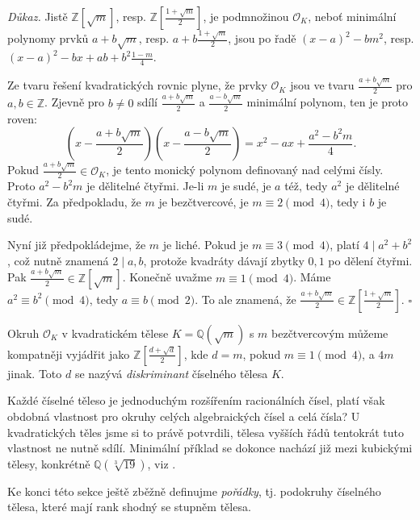 \documentclass[12pt]{report}
\begin{document}
\noindent \textit{Důkaz.} Jistě $\mathbb{Z}[\sqrt{m}]$, resp. $\mathbb{Z}\left[\frac{1+\sqrt{m}}{2}\right]$, je podmnožinou $\mathcal{O}_K$, neboť minimální polynomy prvků $a+b\sqrt{m}$, resp. $a+b\frac{1+\sqrt{m}}{2}$, jsou po řadě $(x-a)^2 - b m^2$, resp. $(x-a)^2 - bx + ab + b^2 \frac{1-m}{4}$.

Ze tvaru řešení kvadratických rovnic plyne, že prvky $\mathcal{O}_K$ jsou ve tvaru $\frac{a+b\sqrt{m}}{2}$ pro $a,b \in \mathbb{Z}$. Zjevně pro $b \neq 0$ sdílí $\frac{a+b\sqrt{m}}{2}$ a $\frac{a-b\sqrt{m}}{2}$ minimální polynom, ten je proto roven:
\begin{equation*}
\left(x - \frac{a+b\sqrt{m}}{2} \right)\left( x - \frac{a-b\sqrt{m}}{2}\right) = x^2 - ax + \frac{a^2 - b^2 m}{4}.
\end{equation*} 
Pokud $\frac{a+b\sqrt{m}}{2} \in \mathcal{O}_K$, je tento monický polynom definovaný nad celými čísly. Proto $a^2 - b^2 m$ je dělitelné čtyřmi. Je-li $m$ je sudé, je $a$ též, tedy $a^2 $ je dělitelné čtyřmi. Za předpokladu, že $m$ je bezčtvercové, je $m \equiv 2 \pmod{4}$, tedy i $b$ je sudé.

Nyní již předpokládejme, že $m$ je liché. Pokud je $m \equiv 3 \pmod{4}$, platí $4 \mid a^2 + b^2$, což nutně znamená $2 \mid a,b$, protože kvadráty dávají zbytky $0,1$ po dělení čtyřmi. Pak $\frac{a+b\sqrt{m}}{2} \in \mathbb{Z}[\sqrt{m}]$. Konečně uvažme $m \equiv 1 \pmod{4}$. Máme $a^2 \equiv b^2 \pmod{4}$, tedy $a \equiv b \pmod{2}$. To ale znamená, že $\frac{a+b\sqrt{m}}{2} \in \mathbb{Z}\left[\frac{1+\sqrt{m}}{2}\right]$. \hfill $\square$\\

\begin{poznamka}
Okruh $\mathcal{O}_K$ v kvadratickém tělese $K = \mathbb{Q}(\sqrt{m})$ s $m$ bezčtvercovým můžeme kompatněji vyjádřit jako $\mathbb{Z}\left[\frac{d+\sqrt{d}}{2}\right]$, kde $d = m$, pokud $m \equiv 1 \pmod{4}$, a $4m$ jinak. Toto $d$ se nazývá \textit{diskriminant} číselného tělesa $K$.
\end{poznamka}

Každé číselné těleso je jednoduchým rozšířením racionálních čísel, platí však obdobná vlastnost pro okruhy celých algebraických čísel a celá čísla? U kvadratických těles jsme si to právě potvrdili, tělesa vyšších řádů tentokrát tuto vlastnost ne nutně sdílí. Minimální příklad se dokonce nachází již mezi kubickými tělesy, konkrétně $\mathbb{Q}(\sqrt[3]{19})$, viz \cite[Ex. 2.3.]{Conrad3}.

Ke konci této sekce ještě zběžně definujme \textit{pořádky}, tj. podokruhy číselného tělesa, které mají rank shodný se stupněm tělesa.
\end{document}
